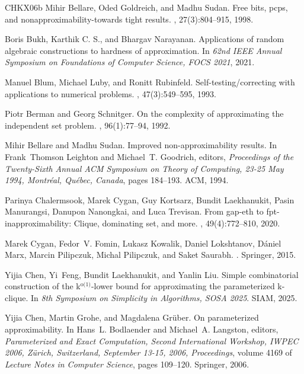 \documentclass[10pt,a4paper]{article}
\begin{document}
\begin{thebibliography}{CHKX06b}
Mihir Bellare, Oded Goldreich, and Madhu Sudan.
\newblock Free bits, pcps, and nonapproximability-towards tight results.
, 27(3):804--915, 1998.

Boris Bukh, {Karthik {C. S.}}, and Bhargav Narayanan.
\newblock Applications of random algebraic constructions to hardness of
  approximation.
\newblock In {\em 62nd {IEEE} Annual Symposium on Foundations of Computer
  Science, {FOCS} 2021}, 2021.

Manuel Blum, Michael Luby, and Ronitt Rubinfeld.
\newblock Self-testing/correcting with applications to numerical problems.
, 47(3):549--595, 1993.

Piotr Berman and Georg Schnitger.
\newblock On the complexity of approximating the independent set problem.
, 96(1):77--94, 1992.

Mihir Bellare and Madhu Sudan.
\newblock Improved non-approximability results.
\newblock In Frank~Thomson Leighton and Michael~T. Goodrich, editors, {\em
  Proceedings of the Twenty-Sixth Annual {ACM} Symposium on Theory of
  Computing, 23-25 May 1994, Montr{\'{e}}al, Qu{\'{e}}bec, Canada}, pages
  184--193. {ACM}, 1994.

Parinya Chalermsook, Marek Cygan, Guy Kortsarz, Bundit Laekhanukit, Pasin
  Manurangsi, Danupon Nanongkai, and Luca Trevisan.
\newblock From gap-eth to fpt-inapproximability: Clique, dominating set, and
  more.
, 49(4):772--810, 2020.

Marek Cygan, Fedor~V. Fomin, Lukasz Kowalik, Daniel Lokshtanov, D{\'{a}}niel
  Marx, Marcin Pilipczuk, Michal Pilipczuk, and Saket Saurabh.
.
\newblock Springer, 2015.

Yijia Chen, Yi~Feng, Bundit Laekhanukit, and Yanlin Liu.
\newblock Simple combinatorial construction of the k\({}^{\mbox{o(1)}}\)-lower
  bound for approximating the parameterized k-clique.
\newblock In {\em 8th Symposium on Simplicity in Algorithms, {SOSA} 2025}.
  {SIAM}, 2025.

Yijia Chen, Martin Grohe, and Magdalena Gr{\"{u}}ber.
\newblock On parameterized approximability.
\newblock In Hans~L. Bodlaender and Michael~A. Langston, editors, {\em
  Parameterized and Exact Computation, Second International Workshop, {IWPEC}
  2006, Z{\"{u}}rich, Switzerland, September 13-15, 2006, Proceedings}, volume
  4169 of {\em Lecture Notes in Computer Science}, pages 109--120. Springer,
  2006.


\end{thebibliography}
\end{document}
